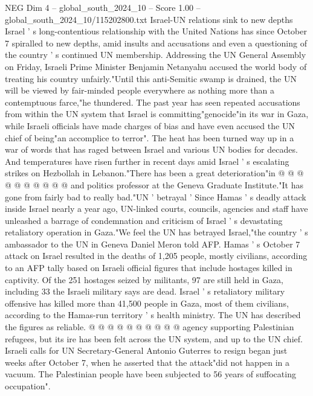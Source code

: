 \begin{textsample}{NEG Dim 4 – global\_south\_2024\_10 – Score 1.00 – global\_south\_2024\_10/115202800.txt}  \label{ex:f4_neg_077}
Israel-UN relations sink to new depths Israel ' s long-contentious relationship with the United Nations has since October 7 spiralled to new depths, amid insults and accusations and even a questioning of the country ' s continued UN membership.
Addressing the UN General Assembly on Friday, Israeli Prime Minister Benjamin Netanyahu accused the world body of treating his country unfairly."Until this anti-Semitic swamp is drained, the UN will be viewed by fair-minded people everywhere as nothing more than a contemptuous farce,"he thundered.
The past year has seen repeated accusations from within the UN system that Israel is committing"genocide"in its war in Gaza, while Israeli officials have made charges of bias and have even accused the UN chief of being"an accomplice to terror".
The heat has been turned way up in a war of words that has raged between Israel and various UN bodies for decades.
And temperatures have risen further in recent days amid Israel ' s escalating strikes on Hezbollah in Lebanon."There has been a great deterioration"in @ @ @ @ @ @ @ @ @ @ and politics professor at the Geneva Graduate Institute."It has gone from fairly bad to really bad."UN ' betrayal ' Since Hamas ' s deadly attack inside Israel nearly a year ago, UN-linked courts, councils, agencies and staff have unleashed a barrage of condemnation and criticism of Israel ' s devastating retaliatory operation in Gaza."We feel the UN has betrayed Israel,"the country ' s ambassador to the UN in Geneva Daniel Meron told AFP.
Hamas ' s October 7 attack on Israel resulted in the deaths of 1,205 people, mostly civilians, according to an AFP tally based on Israeli official figures that include hostages killed in captivity.
Of the 251 hostages seized by militants, 97 are still held in Gaza, including 33 the Israeli military says are dead.
Israel ' s retaliatory military offensive has killed more than 41,500 people in Gaza, most of them civilians, according to the Hamas-run territory ' s health ministry.
The UN has described the figures as reliable. @ @ @ @ @ @ @ @ @ @ agency supporting Palestinian refugees, but its ire has been felt across the UN system, and up to the UN chief.
Israeli calls for UN Secretary-General Antonio Guterres to resign began just weeks after October 7, when he asserted that the attack"did not happen in a vacuum.
The Palestinian people have been subjected to 56 years of suffocating occupation".

\end{textsample}
